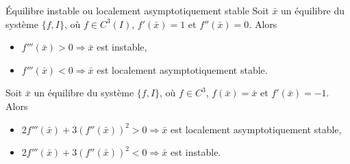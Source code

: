         \begin{theorem}{Équilibre instable ou localement asymptotiquement stable}
            Soit $\bar{x}$ un équilibre du système $\{f, I\}$, où $f \in C^3(I)$, $f'(\bar{x}) = 1$ et $f''(\bar{x}) = 0$. Alors
            \begin{itemize}
                \item $f'''(\bar{x}) > 0 \Rightarrow \bar{x}$ est instable,
                \item $f'''(\bar{x}) < 0 \Rightarrow \bar{x}$ est localement asymptotiquement stable.
            \end{itemize}
            
            Soit $\bar{x}$ un équilibre du système $\{f, I\}$, où $f \in C^3$, $f(\bar{x}) = \bar{x}$ et $f'(\bar{x}) = -1$. Alors
            \begin{itemize}
                \item $2f'''(\bar{x}) + 3 (f''(\bar{x}))^2 > 0 \Rightarrow \bar{x}$ est localement asymptotiquement stable,
                \item $2f'''(\bar{x}) + 3 (f''(\bar{x}))^2 < 0 \Rightarrow \bar{x}$ est instable.
            \end{itemize}
        \end{theorem}

